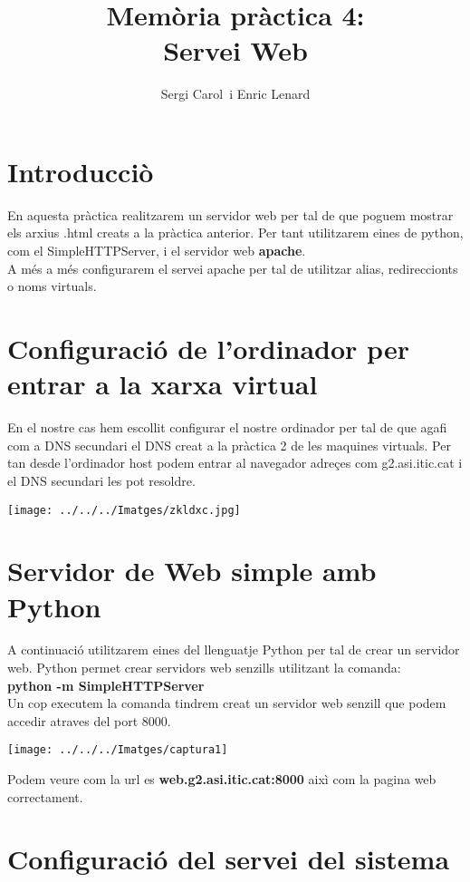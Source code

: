 \documentclass[11p]{article}
\title{\huge\textbf{ Memòria pràctica 4:\\ Servei Web}}
\author{Sergi Carol\ i Enric Lenard }
\begin{document}
\maketitle

\section*{Introducciò}

En aquesta pràctica realitzarem un servidor web per tal de que poguem mostrar els arxius .html creats a la pràctica anterior. Per tant utilitzarem eines de python, com el SimpleHTTPServer, i el servidor web \textbf{apache}.\\
A més a més configurarem el servei apache per tal de utilitzar alias, redireccionts o noms virtuals.

\section{Configuració de l'ordinador per entrar a la xarxa virtual}

En el nostre cas hem escollit configurar el nostre ordinador per tal de que agafi com a DNS secundari el DNS creat a la pràctica 2 de les maquines virtuals. Per tan desde l'ordinador host podem entrar al navegador adreçes com g2.asi.itic.cat i el DNS secundari les pot resoldre.

\centerline{\texttt{[image: ../../../Imatges/zkldxc.jpg]}}

\section{Servidor de Web simple amb Python}

A continuació utilitzarem eines del llenguatje Python per tal de crear un servidor web. Python permet crear servidors web senzills utilitzant la comanda:\\
\textbf{python -m SimpleHTTPServer }\\
Un cop executem la comanda tindrem creat un servidor web senzill que podem accedir atraves del port 8000.\\
\centerline{\texttt{[image: ../../../Imatges/captura1]}} 
Podem veure com la url es \textbf{web.g2.asi.itic.cat:8000} aixì com la pagina web correctament.\\
\section{Configuració del servei del sistema}
\end{document}
